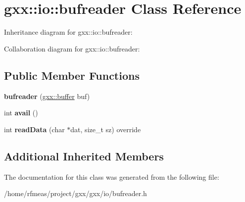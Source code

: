 \hypertarget{classgxx_1_1io_1_1bufreader}{}\section{gxx\+:\+:io\+:\+:bufreader Class Reference}
\label{classgxx_1_1io_1_1bufreader}


Inheritance diagram for gxx\+:\+:io\+:\+:bufreader\+:


Collaboration diagram for gxx\+:\+:io\+:\+:bufreader\+:
\subsection*{Public Member Functions}
\begin{DoxyCompactItemize}
\item 
{\bfseries bufreader} (\hyperlink{classgxx_1_1buffer}{gxx\+::buffer} buf)\hypertarget{classgxx_1_1io_1_1bufreader_a871b9310e3a430f104db147871fb93fa}{}\label{classgxx_1_1io_1_1bufreader_a871b9310e3a430f104db147871fb93fa}

\item 
int {\bfseries avail} ()\hypertarget{classgxx_1_1io_1_1bufreader_a49b787c9b5416fe85e7307015d8839e5}{}\label{classgxx_1_1io_1_1bufreader_a49b787c9b5416fe85e7307015d8839e5}

\item 
int {\bfseries read\+Data} (char $\ast$dat, size\+\_\+t sz) override\hypertarget{classgxx_1_1io_1_1bufreader_aa329e29d43c25d0565c56f727ca97ea0}{}\label{classgxx_1_1io_1_1bufreader_aa329e29d43c25d0565c56f727ca97ea0}

\end{DoxyCompactItemize}
\subsection*{Additional Inherited Members}


The documentation for this class was generated from the following file\+:\begin{DoxyCompactItemize}
\item 
/home/rfmeas/project/gxx/gxx/io/bufreader.\+h\end{DoxyCompactItemize}
